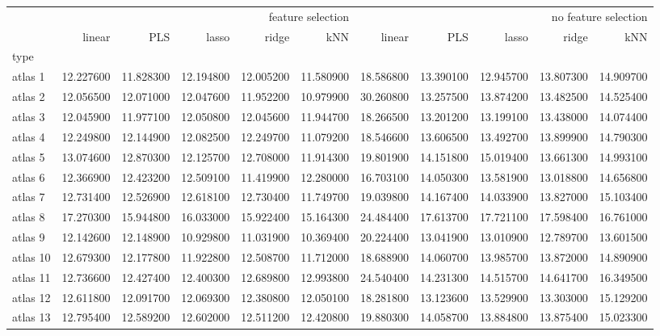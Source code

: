 \documentclass[a4paper]{article}
\begin{document}
\thispagestyle{empty}
\begin{landscape}
\begin{tabular}{lrrrrrrrrrr}
\toprule
 & \multicolumn{5}{r}{feature selection} & \multicolumn{5}{r}{no feature selection} \\
 & linear & PLS & lasso & ridge & kNN & linear & PLS & lasso & ridge & kNN \\
type &  &  &  &  &  &  &  &  &  &  \\
\midrule
atlas 1 & 12.227600 & 11.828300 & 12.194800 & 12.005200 & 11.580900 & 18.586800 & 13.390100 & 12.945700 & 13.807300 & 14.909700 \\
atlas 2 & 12.056500 & 12.071000 & 12.047600 & 11.952200 & 10.979900 & 30.260800 & 13.257500 & 13.874200 & 13.482500 & 14.525400 \\
atlas 3 & 12.045900 & 11.977100 & 12.050800 & 12.045600 & 11.944700 & 18.266500 & 13.201200 & 13.199100 & 13.438000 & 14.074400 \\
atlas 4 & 12.249800 & 12.144900 & 12.082500 & 12.249700 & 11.079200 & 18.546600 & 13.606500 & 13.492700 & 13.899900 & 14.790300 \\
atlas 5 & 13.074600 & 12.870300 & 12.125700 & 12.708000 & 11.914300 & 19.801900 & 14.151800 & 15.019400 & 13.661300 & 14.993100 \\
atlas 6 & 12.366900 & 12.423200 & 12.509100 & 11.419900 & 12.280000 & 16.703100 & 14.050300 & 13.581900 & 13.018800 & 14.656800 \\
atlas 7 & 12.731400 & 12.526900 & 12.618100 & 12.730400 & 11.749700 & 19.039800 & 14.167400 & 14.033900 & 13.827000 & 15.103400 \\
atlas 8 & 17.270300 & 15.944800 & 16.033000 & 15.922400 & 15.164300 & 24.484400 & 17.613700 & 17.721100 & 17.598400 & 16.761000 \\
atlas 9 & 12.142600 & 12.148900 & 10.929800 & 11.031900 & 10.369400 & 20.224400 & 13.041900 & 13.010900 & 12.789700 & 13.601500 \\
atlas 10 & 12.679300 & 12.177800 & 11.922800 & 12.508700 & 11.712000 & 18.688900 & 14.060700 & 13.985700 & 13.872000 & 14.890900 \\
atlas 11 & 12.736600 & 12.427400 & 12.400300 & 12.689800 & 12.993800 & 24.540400 & 14.231300 & 14.515700 & 14.641700 & 16.349500 \\
atlas 12 & 12.611800 & 12.091700 & 12.069300 & 12.380800 & 12.050100 & 18.281800 & 13.123600 & 13.529900 & 13.303000 & 15.129200 \\
atlas 13 & 12.795400 & 12.589200 & 12.602000 & 12.511200 & 12.420800 & 19.880300 & 14.058700 & 13.884800 & 13.875400 & 15.023300 \\

\end{tabular}
\end{landscape}
\end{document}
